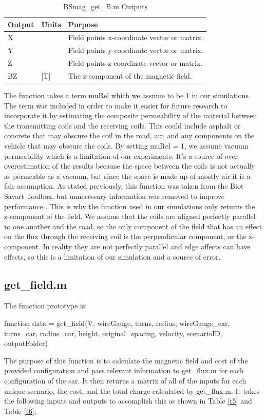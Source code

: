 \begin{table}[H]
    \caption[BSmag\_get\_B.m Outputs]{BSmag\_get\_B.m Outputs}
    \begin{center}
    \begin{tabular}{| p{} | p{} | p{} |}
    \hline
    Output & Units & Purpose \\
    \hline \hline
    X & & Field points x-coordinate vector or matrix. \\
    Y & & Field points y-coordinate vector or matrix. \\
    Z & & Field points z-coordinate vector or matrix. \\
    BZ & [T] & The z-component of the magnetic field. \\
    \hline
    \end{tabular}
    \end{center}
    \label{t4}
\end{table}

The function takes a term muRel which we assume to be 1 in our simulations. The term was included in order to 
make it easier for future research to incorporate it by estimating the composite permeability of the material 
between the transmitting coils and the receiving coils. This could include asphalt or concrete that may obscure 
the coil in the road, air, and any components on the vehicle that may obscure the coils.  By setting muRel = 1, 
we assume vacuum permeability which is a limitation of our experiments. It’s a source of over overestimation 
of the results because the space between the coils is not actually as permeable as a vacuum, but since the space 
is made up of mostly air it is a fair assumption. As stated previously, this function was taken from the Biot 
Savart Toolbox, but unnecessary information was removed to improve performance \cite{lqueval_lquevalbsmag_2020}.  
This is why the function used in our simulations only returns the z-component of the field. We assume that the coils 
are aligned perfectly parallel to one another and the road, so the only component of the field that has an effect on 
the flux through the receiving coil is the perpendicular component, or the z-component. In reality they are not 
perfectly parallel and edge affects can have effects, so this is a limitation of our simulation and a source of error. 

\subsection{get\_field.m}
The function prototype is:
\begin{center}
    function data = get\_field(V, wireGauge, turns, radius, wireGauge\_car, turns\_car, radius\_car, height, original\_spacing, velocity, scenarioID, outputFolder)
\end{center}
The purpose of this function is to calculate the magnetic 
field and cost of the provided configuration and pass relevant information to get\_flux.m for each configuration 
of the car. It then returns a matrix of all of the inputs for each unique scenario, the cost, and the total charge 
calculated by get\_flux.m. It takes the following inputs and outputs to accomplish this as shown in 
Table \ref{t5} and Table \ref{t6}:

